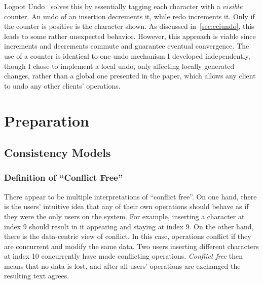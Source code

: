 \documentclass[12pt,a4paper,twoside,openright]{report}
\begin{document}

Logoot Undo~\cite{weiss2010undo} solves this by essentially tagging each character with a $visible$ counter. An undo of an insertion decrements it, while redo increments it. Only if the counter is positive is the character shown. As discussed in~\cref{sec:cciundo}, this leads to some rather unexpected behavior. However, this approach is viable since increments and decrements commute and guarantee eventual convergence. The use of a counter is identical to one undo mechanism I developed independently, though I chose to implement a local undo, only affecting locally generated changes, rather than a global one presented in the paper, which allows any client to undo any other clients' operations.


\chapter{Preparation}


\section{Consistency Models}

	\subsection{Definition of ``Conflict Free''}
	
	There appear to be multiple interpretations of ``conflict free''. On one hand, there is the users' intuitive idea that any of their own operations should behave as if they were the only users on the system. For example, inserting a character at index 9 should result in it appearing and staying at index 9. On the other hand, there is the data-centric view of conflict. In this case, operations conflict if they are concurrent and modify the same data. Two users inserting different characters at index 10 concurrently have made conflicting operations. \textit{Conflict free} then means that no data is lost, and after all users' operations are exchanged the resulting text agrees.
	
\end{document}
